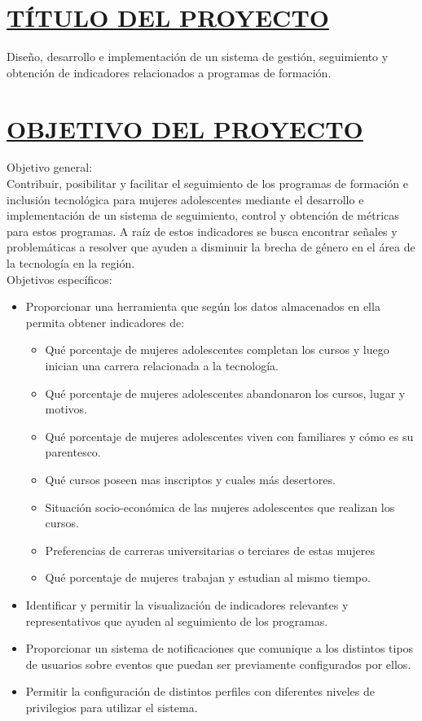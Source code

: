 \section*{\underline{TÍTULO DEL PROYECTO}}
Diseño, desarrollo e implementación de un sistema de gestión, seguimiento y obtención de indicadores relacionados a programas de formación.\\


\section*{\underline{OBJETIVO DEL PROYECTO}}
Objetivo general:\\

Contribuir, posibilitar y facilitar el seguimiento de los programas de formación e inclusión tecnológica para mujeres adolescentes mediante el desarrollo e implementación de un sistema de seguimiento, control y obtención de métricas para estos programas.
A raíz de estos indicadores se busca encontrar señales y problemáticas a resolver que ayuden a disminuir la brecha de género en el área de la tecnología en la región.\\

Objetivos específicos:
\begin{itemize}
	\item Proporcionar una herramienta que según los datos almacenados en ella permita obtener indicadores de:
	\begin{itemize}
	\item Qué porcentaje de mujeres adolescentes completan los cursos y luego inician una carrera relacionada a la tecnología.
	\item Qué porcentaje de mujeres adolescentes abandonaron los cursos, lugar y motivos.
	\item Qué porcentaje de mujeres adolescentes viven con familiares y cómo es su parentesco.
	\item Qué cursos poseen mas inscriptos y cuales más desertores.
	\item Situación socio-económica de las mujeres adolescentes que realizan los cursos.
	\item Preferencias de carreras universitarias o terciares de estas mujeres
	\item Qué porcentaje de mujeres trabajan y estudian al mismo tiempo.
	\end{itemize}
	\item Identificar y permitir la visualización de indicadores relevantes y representativos que ayuden al seguimiento de los programas.
	\item Proporcionar un sistema de notificaciones que comunique a los distintos tipos de usuarios sobre eventos que puedan ser previamente configurados por ellos.
	\item Permitir la configuración de distintos perfiles con diferentes niveles de  privilegios para utilizar el sistema.\\
\end{itemize}


